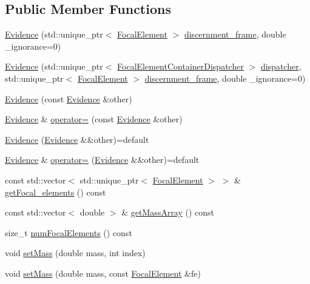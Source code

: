 \subsection*{Public Member Functions}
\begin{DoxyCompactItemize}
\item 
\hyperlink{classEvidence_a85bcdfc070d0885b2c49c6930fe5a30f}{Evidence} (std\+::unique\+\_\+ptr$<$ \hyperlink{classFocalElement}{Focal\+Element} $>$ \hyperlink{classEvidence_a4564fa5d7963b912d66549ac33d86dfd}{discernment\+\_\+frame}, double \+\_\+ignorance=0)
\item 
\hyperlink{classEvidence_a0e7f11da2d686f8a33e3e59937b543d5}{Evidence} (std\+::unique\+\_\+ptr$<$ \hyperlink{classFocalElementContainerDispatcher}{Focal\+Element\+Container\+Dispatcher} $>$ \hyperlink{classEvidence_a8ae2742750940957698135fd9014d6d4}{dispatcher}, std\+::unique\+\_\+ptr$<$ \hyperlink{classFocalElement}{Focal\+Element} $>$ \hyperlink{classEvidence_a4564fa5d7963b912d66549ac33d86dfd}{discernment\+\_\+frame}, double \+\_\+ignorance=0)
\item 
\hyperlink{classEvidence_a5e0b5cb75efbbcff102602ab07ed0ce5}{Evidence} (const \hyperlink{classEvidence}{Evidence} \&other)
\item 
\hyperlink{classEvidence}{Evidence} \& \hyperlink{classEvidence_a2e6f8b584bba250e859e4b8f16f286e2}{operator=} (const \hyperlink{classEvidence}{Evidence} \&other)
\item 
\hyperlink{classEvidence_a749172343fd62d98eb6c42636b5b61a4}{Evidence} (\hyperlink{classEvidence}{Evidence} \&\&other)=default
\item 
\hyperlink{classEvidence}{Evidence} \& \hyperlink{classEvidence_a02106bb9e91afce2555be1cd830862de}{operator=} (\hyperlink{classEvidence}{Evidence} \&\&other)=default
\item 
const std\+::vector$<$ std\+::unique\+\_\+ptr$<$ \hyperlink{classFocalElement}{Focal\+Element} $>$ $>$ \& \hyperlink{classEvidence_ab2d805af2fafd03c9d148040eeb181b0}{get\+Focal\+\_\+elements} () const 
\item 
const std\+::vector$<$ double $>$ \& \hyperlink{classEvidence_a5cbcf217bf5159feccedba5edbd250c1}{get\+Mass\+Array} () const 
\item 
size\+\_\+t \hyperlink{classEvidence_af58901dda7c77519e3638b95304c4878}{num\+Focal\+Elements} () const 
\item 
void \hyperlink{classEvidence_ac12ebfac60dd08a07c3e852e66903520}{set\+Mass} (double mass, int index)
\item 
void \hyperlink{classEvidence_a854a8035ac5f008e9173edcfcf40f071}{set\+Mass} (double mass, const \hyperlink{classFocalElement}{Focal\+Element} \&fe)

\end{DoxyCompactItemize}
